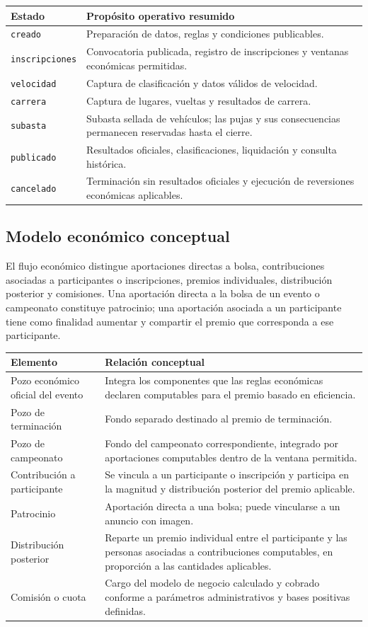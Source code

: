 \documentclass[10pt,letterpaper]{article}
\begin{document}
\begin{longtable}{P{2.85cm}P{10.65cm}}
\toprule
\textbf{Estado} & \textbf{Propósito operativo resumido}\\
\midrule
\texttt{creado} & Preparación de datos, reglas y condiciones publicables.\\
\texttt{inscripciones} & Convocatoria publicada, registro de inscripciones y ventanas económicas permitidas.\\
\texttt{velocidad} & Captura de clasificación y datos válidos de velocidad.\\
\texttt{carrera} & Captura de lugares, vueltas y resultados de carrera.\\
\texttt{subasta} & Subasta sellada de vehículos; las pujas y sus consecuencias permanecen reservadas hasta el cierre.\\
\texttt{publicado} & Resultados oficiales, clasificaciones, liquidación y consulta histórica.\\
\texttt{cancelado} & Terminación sin resultados oficiales y ejecución de reversiones económicas aplicables.\\
\bottomrule
\end{longtable}

\subsection{Modelo económico conceptual}
El flujo económico distingue aportaciones directas a bolsa, contribuciones asociadas a participantes o inscripciones, premios individuales, distribución posterior y comisiones. Una aportación directa a la bolsa de un evento o campeonato constituye patrocinio; una aportación asociada a un participante tiene como finalidad aumentar y compartir el premio que corresponda a ese participante.

\begin{longtable}{P{3.7cm}P{9.8cm}}
\toprule
\textbf{Elemento} & \textbf{Relación conceptual}\\
\midrule
Pozo económico oficial del evento & Integra los componentes que las reglas económicas declaren computables para el premio basado en eficiencia.\\
Pozo de terminación & Fondo separado destinado al premio de terminación.\\
Pozo de campeonato & Fondo del campeonato correspondiente, integrado por aportaciones computables dentro de la ventana permitida.\\
Contribución a participante & Se vincula a un participante o inscripción y participa en la magnitud y distribución posterior del premio aplicable.\\
Patrocinio & Aportación directa a una bolsa; puede vincularse a un anuncio con imagen.\\
Distribución posterior & Reparte un premio individual entre el participante y las personas asociadas a contribuciones computables, en proporción a las cantidades aplicables.\\
Comisión o cuota & Cargo del modelo de negocio calculado y cobrado conforme a parámetros administrativos y bases positivas definidas.\\
\bottomrule
\end{longtable}
\end{document}
